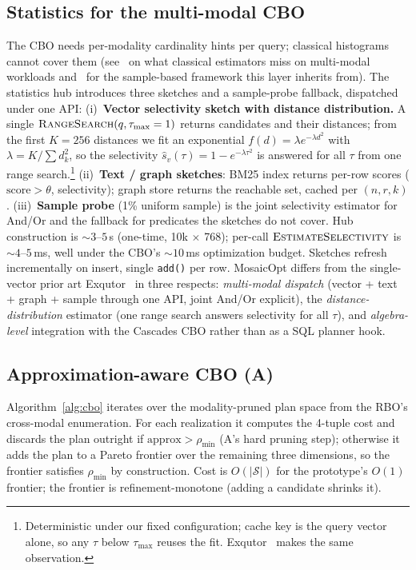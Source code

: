 \documentclass[sigconf]{acmart}
\theoremstyle{plain}
\theoremstyle{definition}
\theoremstyle{remark}
\begin{document}
\subsection{Statistics for the multi-modal CBO}\label{sec:cbo:stats}

The CBO needs per-modality cardinality hints per query;
classical histograms cannot cover them (see~\cite{leis2015cardinality}
on what classical estimators miss on multi-modal
workloads and~\cite{wu2018sampleseek} for the
sample-based framework this layer inherits from). The
statistics hub introduces three sketches and a sample-probe
fallback, dispatched under one API: (i)~\textbf{Vector
selectivity sketch with distance distribution.} A single
$\Call{RangeSearch}{q, \tau_{\max}=1}$ returns candidates and
their distances; from the first $K = 256$ distances we fit an
exponential $f(d) = \lambda e^{-\lambda d^2}$ with
$\lambda = K / \sum d_k^2$, so the selectivity
$\hat{s}_v(\tau) = 1 - e^{-\lambda \tau^2}$ is answered for all
$\tau$ from one range search.\footnote{Deterministic under
our fixed configuration; cache key is the query vector
alone, so any $\tau$ below $\tau_{\max}$ reuses the fit.
Exqutor~\cite{kim2026exqutor} makes the same observation.}
(ii)~\textbf{Text / graph sketches}: BM25 index returns per-row
scores ($\mathrm{score} > \theta$, selectivity); graph store
returns the reachable set, cached per $(n, r, k)$.
(iii)~\textbf{Sample probe} (1\% uniform sample) is the joint
selectivity estimator for And/Or and the fallback for
predicates the sketches do not cover. Hub construction is
$\sim 3$--$5$\,s (one-time, 10k $\times$ 768); per-call
$\Call{EstimateSelectivity}{}$ is $\sim 4$--$5$\,ms, well under
the CBO's $\sim 10$\,ms optimization budget. Sketches refresh
incrementally on insert, single \texttt{add()} per row.
MosaicOpt differs from the single-vector prior art
Exqutor~\cite{kim2026exqutor} in three respects:
\emph{multi-modal dispatch} (vector + text + graph + sample
through one API, joint And/Or explicit), the
\emph{distance-distribution} estimator (one range search
answers selectivity for all $\tau$), and \emph{algebra-level}
integration with the Cascades CBO rather than as a SQL
planner hook.

\subsection{Approximation-aware CBO (A)}\label{sec:cbo:approx}

Algorithm~\ref{alg:cbo} iterates over the modality-pruned
plan space from the RBO's cross-modal enumeration. For each
realization it computes the 4-tuple cost and discards the
plan outright if $\mathrm{approx} > \rho_{\min}$ (A's hard
pruning step); otherwise it adds the plan to a Pareto
frontier over the remaining three dimensions, so the
frontier satisfies $\rho_{\min}$ by construction. Cost is
$O(|\mathcal{S}|)$ for the prototype's $O(1)$ frontier;
the frontier is refinement-monotone (adding a candidate
shrinks it).
\end{document}
